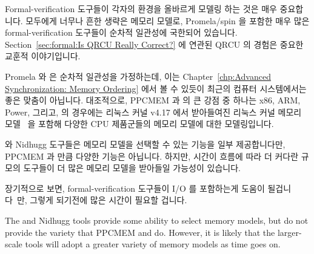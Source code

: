 Formal-verification 도구들이 각자의 환경을 올바르게 모델링 하는 것은 매우
중요합니다.
모두에게 너무나 흔한 생략은 메모리 모델로, Promela/spin 을 포함한 매우 많은
formal-verification 도구들이 순차적 일관성에 국한되어 있습니다.
Section~\ref{sec:formal:Is QRCU Really Correct?}
에 연관된 QRCU 의 경험은 중요한 교훈적 이야기입니다.

Promela 와  은 순차적 일관성을 가정하는데, 이는
Chapter~\ref{chp:Advanced Synchronization: Memory Ordering} 에서 볼 수 있듯이
최근의 컴퓨터 시스템에서는 좋은 맞춤이 아닙니다.
대조적으로, PPCMEM 과  의 큰 강점 중 하나는 x86, ARM, Power, 그리고,
 의 경우에는 리눅스 커널 v4.17 에서 받아들여진 리눅스 커널 메모리
모델~\cite{Alglave:2018:FSC:3173162.3177156} 을 포함해 다양한 CPU 제품군들의
메모리 모델에 대한 모델링입니다.
\iffalse

It is critically important that formal-verification tools correctly
model their environment.
One all-too-common omission is the memory model, where a great
many formal-verification tools, including Promela/spin, are
restricted to sequential consistency.
The QRCU experience related in
Section~\ref{sec:formal:Is QRCU Really Correct?}
is an important cautionary tale.

Promela and \co{spin} assume sequential consistency, which is not a
good match for modern computer systems, as was seen in
Chapter~\ref{chp:Advanced Synchronization: Memory Ordering}.
In contrast, one of the great strengths of PPCMEM and \co{herd}
is their detailed modeling of various CPU families memory models,
including x86, ARM, Power, and, in the case of \co{herd},
even a Linux-kernel memory model~\cite{Alglave:2018:FSC:3173162.3177156},
which has been been accepted into version v4.17 of
the Linux kernel.
\fi

 와 Nidhugg 도구들은 메모리 모델을 선택할 수 있는 기능을 일부
제공합니다만, PPCMEM 과  만큼 다양한 기능은 아닙니다.
하지만, 시간이 흐름에 따라 더 커다란 규모의 도구들이 더 많은 메모리 모델을
받아들일 가능성이 있습니다.

장기적으로 보면, formal-verification 도구들이 I/O 를 포함하는게 도움이
될겁니다~\cite{PaulEMcKenney2016LinuxKernelMMIO}만, 그렇게 되기전에 많은 시간이
필요할 겁니다.
\iffalse

The  and Nidhugg tools provide some ability to select
memory models, but do not provide the variety that PPCMEM and
 do.
However, it is likely that the larger-scale tools will adopt
a greater variety of memory models as time goes on.

